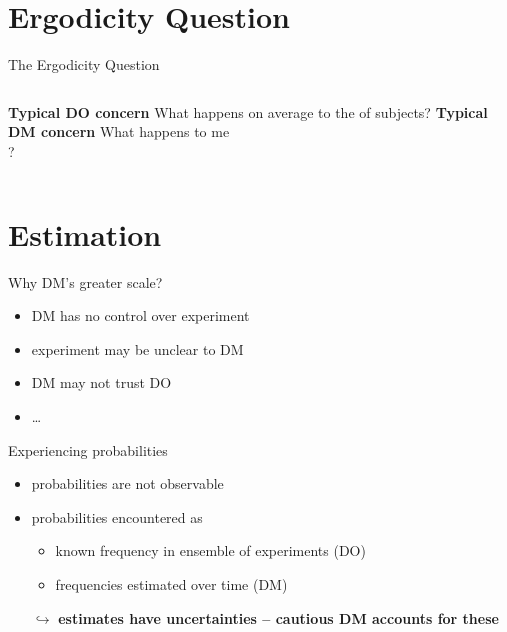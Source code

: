 \section{Ergodicity Question}

\begin{frame}{The Ergodicity Question}
\begin{columns}[T]
	\bc \textbf{Typical DO concern} \ec
	What happens on average to the  of subjects?
\centering \vspace{4em}  \red{\large $\neq$}
	\bc \textbf{Typical DM concern} \ec
	What happens to me \\
	?
\end{columns}
\end{frame}


\section{Estimation}

\begin{frame}{Why DM's greater scale?}
\begin{itemize}
  \item DM has no control over experiment
  \item experiment may be unclear to DM
  \item DM may not trust DO
  \item \ldots
\end{itemize}
\end{frame}

\begin{frame}{Experiencing probabilities}

\begin{itemize}
  \item probabilities are not observable
  \item probabilities encountered as
  	\begin{itemize}
  		\item known frequency in ensemble of experiments (DO)
  		\item frequencies estimated over time (DM)
  	\end{itemize}
  \item[$\hookrightarrow$] \textbf{estimates have uncertainties -- cautious DM accounts for these}

\end{itemize}
\end{frame}


